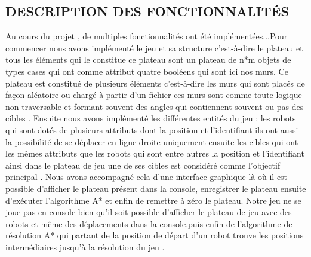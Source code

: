 \documentclass[a4paper]{article} %
\begin{document}
\subsection{DESCRIPTION  DES FONCTIONNALITÉS }
Au cours du projet , de multiples fonctionnalités ont été implémentées...Pour commencer nous avons implémenté le jeu et sa structure c'est-à-dire le plateau et tous les éléments qui le constitue ce plateau sont un plateau de n*m objets de types cases qui ont comme attribut quatre booléens qui sont ici nos murs. Ce plateau est constitué de plusieurs éléments c'est-à-dire les murs qui sont placés de façon aléatoire ou chargé à partir d’un fichier ces murs sont comme toute logique non traversable et formant souvent des angles qui contiennent souvent ou pas des cibles . Ensuite nous avons implémenté les différentes entités du jeu : les robots qui sont dotés de plusieurs attributs dont la position  et l’identifiant ils ont aussi la possibilité de se déplacer en ligne droite uniquement  ensuite les cibles qui ont les mêmes attributs que les robots qui sont entre autres la position et l’identifiant ainsi dans le plateau de jeu une de ses cibles est considéré comme  l'objectif principal . Nous avons accompagné cela d’une interface graphique là où il est possible d'afficher le plateau présent dans la console, enregistrer le plateau  ensuite  d’exécuter l’algorithme A* et enfin de remettre à zéro le plateau. Notre jeu ne se joue pas en console bien qu’il soit possible d’afficher le plateau de jeu avec des robots et même des déplacements dans la console.puis enfin de l’algorithme de résolution A* qui partant de la position de départ d’un robot trouve les positions intermédiaires jusqu’à la résolution du jeu . 
\end{document}
